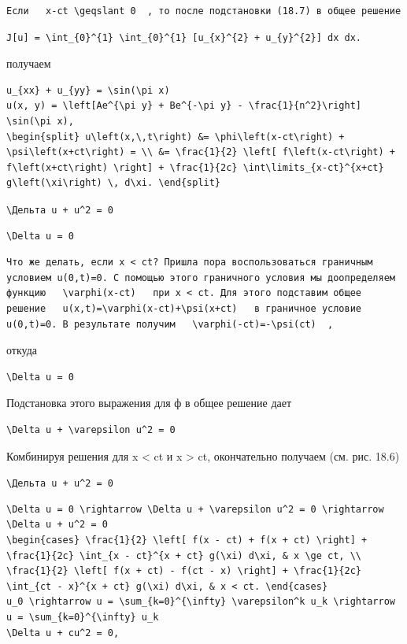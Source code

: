 \documentclass[
  ukrainian,
]{article}
\begin{document}
\begin{verbatim}
Если   x-ct \geqslant 0  , то после подстановки (18.7) в общее решение
\end{verbatim}

\begin{verbatim}
J[u] = \int_{0}^{1} \int_{0}^{1} [u_{x}^{2} + u_{y}^{2}] dx dx.
\end{verbatim}

получаем

\begin{verbatim}
u_{xx} + u_{yy} = \sin(\pi x)
u(x, y) = \left[Ae^{\pi y} + Be^{-\pi y} - \frac{1}{n^2}\right] \sin(\pi x),
\begin{split} u\left(x,\,t\right) &= \phi\left(x-ct\right) + \psi\left(x+ct\right) = \\ &= \frac{1}{2} \left[ f\left(x-ct\right) + f\left(x+ct\right) \right] + \frac{1}{2c} \int\limits_{x-ct}^{x+ct} g\left(\xi\right) \, d\xi. \end{split}
\end{verbatim}

\texttt{\textbackslash{}Дельта\ u\ +\ u\^{}2\ =\ 0}

\begin{verbatim}
\Delta u = 0
\end{verbatim}

\begin{verbatim}
Что же делать, если x < ct? Пришла пора воспользоваться граничным условием u(0,t)=0. С помощью этого граничного условия мы доопределяем функцию   \varphi(x-ct)   при x < ct. Для этого подставим общее решение   u(x,t)=\varphi(x-ct)+\psi(x+ct)   в граничное условие u(0,t)=0. В результате получим   \varphi(-ct)=-\psi(ct)  ,
\end{verbatim}

откуда

\begin{verbatim}
\Delta u = 0
\end{verbatim}

Подстановка этого выражения для ф в общее решение дает

\begin{verbatim}
\Delta u + \varepsilon u^2 = 0
\end{verbatim}

Комбинируя решения для x \textless{} ct и x \textgreater{} ct,
окончательно получаем (см. рис. 18.6)

\texttt{\textbackslash{}Дельта\ u\ +\ u\^{}2\ =\ 0}

\begin{verbatim}
\Delta u = 0 \rightarrow \Delta u + \varepsilon u^2 = 0 \rightarrow \Delta u + u^2 = 0
\begin{cases} \frac{1}{2} \left[ f(x - ct) + f(x + ct) \right] + \frac{1}{2c} \int_{x - ct}^{x + ct} g(\xi) d\xi, & x \ge ct, \\ \frac{1}{2} \left[ f(x + ct) - f(ct - x) \right] + \frac{1}{2c} \int_{ct - x}^{x + ct} g(\xi) d\xi, & x < ct. \end{cases}
u_0 \rightarrow u = \sum_{k=0}^{\infty} \varepsilon^k u_k \rightarrow u = \sum_{k=0}^{\infty} u_k
\Delta u + cu^2 = 0,
\end{verbatim}
\end{document}
